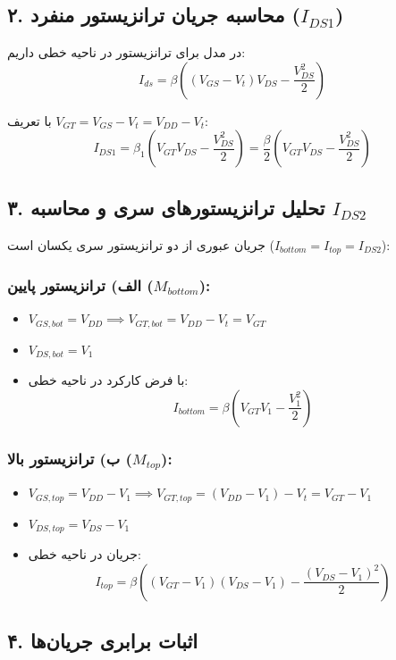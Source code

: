 \subsection*{۲. محاسبه جریان ترانزیستور منفرد (\(I_{DS1}\))}
در مدل  برای ترانزیستور در ناحیه خطی داریم:
\[I_{ds} = \beta \left( (V_{GS} - V_t) V_{DS} - \frac{V_{DS}^2}{2} \right)\]

با تعریف \(V_{GT} = V_{GS} - V_t = V_{DD} - V_t\):
\[I_{DS1} = \beta_1 \left( V_{GT} V_{DS} - \frac{V_{DS}^2}{2} \right) = \frac{\beta}{2} \left( V_{GT} V_{DS} - \frac{V_{DS}^2}{2} \right)\]

\subsection*{۳. تحلیل ترانزیستورهای سری و محاسبه \(I_{DS2}\)}
جریان عبوری از دو ترانزیستور سری یکسان است (\(I_{bottom} = I_{top} = I_{DS2}\)):

\subsubsection*{الف) ترانزیستور پایین (\(M_{bottom}\)):}
\begin{itemize}
\item \(V_{GS,bot} = V_{DD} \implies V_{GT,bot} = V_{DD} - V_t = V_{GT}\)
\item \(V_{DS,bot} = V_1\)
\item با فرض کارکرد در ناحیه خطی:
\[I_{bottom} = \beta \left( V_{GT} V_1 - \frac{V_1^2}{2} \right)\]

\end{itemize}
\subsubsection*{ب) ترانزیستور بالا (\(M_{top}\)):}
\begin{itemize}
\item \(V_{GS,top} = V_{DD} - V_1 \implies V_{GT,top} = (V_{DD} - V_1) - V_t = V_{GT} - V_1\)
\item \(V_{DS,top} = V_{DS} - V_1\)
\item جریان در ناحیه خطی:
\[I_{top} = \beta \left( (V_{GT} - V_1)(V_{DS} - V_1) - \frac{(V_{DS} - V_1)^2}{2} \right)\]

\end{itemize}

\subsection*{۴. اثبات برابری جریان‌ها}

